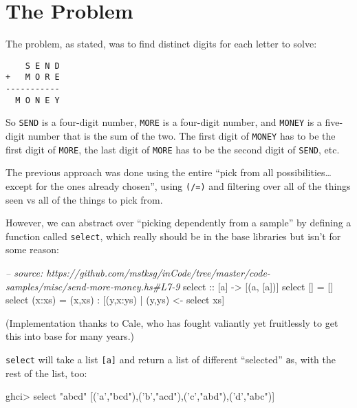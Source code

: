 \documentclass[]{article}
\newenvironment{Shaded}{}{}
\newcommand{\CharTok}[1]{\textcolor[rgb]{0.25,0.44,0.63}{{#1}}}
\newcommand{\StringTok}[1]{\textcolor[rgb]{0.25,0.44,0.63}{{#1}}}
\newcommand{\CommentTok}[1]{\textcolor[rgb]{0.38,0.63,0.69}{\textit{{#1}}}}
\newcommand{\OtherTok}[1]{\textcolor[rgb]{0.00,0.44,0.13}{{#1}}}
\newcommand{\FunctionTok}[1]{\textcolor[rgb]{0.02,0.16,0.49}{{#1}}}
\newcommand{\NormalTok}[1]{{#1}}
\begin{document}
\section{The Problem}\label{the-problem}

The problem, as stated, was to find distinct digits for each letter to solve:

\begin{verbatim}
    S E N D
+   M O R E
-----------
  M O N E Y
\end{verbatim}

So \texttt{SEND} is a four-digit number, \texttt{MORE} is a four-digit number,
and \texttt{MONEY} is a five-digit number that is the sum of the two. The first
digit of \texttt{MONEY} has to be the first digit of \texttt{MORE}, the last
digit of \texttt{MORE} has to be the second digit of \texttt{SEND}, etc.

The previous approach was done using the entire ``pick from all
possibilities\ldots{}except for the ones already chosen'', using \texttt{(/=)}
and filtering over all of the things seen vs all of the things to pick from.

However, we can abstract over ``picking dependently from a sample'' by defining
a function called \texttt{select}, which really should be in the base libraries
but isn't for some reason:

\begin{Shaded}
\begin{Highlighting}[]
\CommentTok{-- source: https://github.com/mstksg/inCode/tree/master/code-samples/misc/send-more-money.hs#L7-9}
\OtherTok{select ::} \NormalTok{[a] }\OtherTok{->} \NormalTok{[(a, [a])]}
\NormalTok{select []     }\FunctionTok{=} \NormalTok{[]}
\NormalTok{select (x}\FunctionTok{:}\NormalTok{xs) }\FunctionTok{=} \NormalTok{(x,xs) }\FunctionTok{:} \NormalTok{[(y,x}\FunctionTok{:}\NormalTok{ys) }\FunctionTok{|} \NormalTok{(y,ys) }\OtherTok{<-} \NormalTok{select xs]}
\end{Highlighting}
\end{Shaded}

(Implementation thanks to Cale, who has fought valiantly yet fruitlessly to get
this into base for many years.)

\texttt{select} will take a list \texttt{{[}a{]}} and return a list of different
``selected'' \texttt{a}s, with the rest of the list, too:

\begin{Shaded}
\begin{Highlighting}[]
\NormalTok{ghci}\FunctionTok{>} \NormalTok{select }\StringTok{"abcd"}
\NormalTok{[(}\CharTok{'a'}\NormalTok{,}\StringTok{"bcd"}\NormalTok{),(}\CharTok{'b'}\NormalTok{,}\StringTok{"acd"}\NormalTok{),(}\CharTok{'c'}\NormalTok{,}\StringTok{"abd"}\NormalTok{),(}\CharTok{'d'}\NormalTok{,}\StringTok{"abc"}\NormalTok{)]}
\end{Highlighting}
\end{Shaded}
\end{document}
